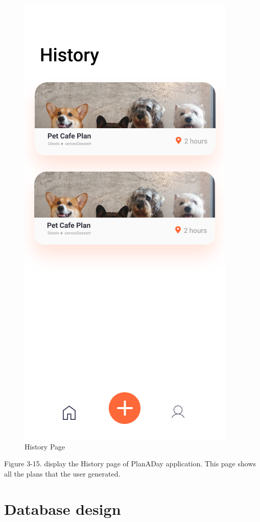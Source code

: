 \newpage
\begin{figure}[!h]
    \centering
    \includegraphics[width=0.5\linewidth]{chapter3/UI_History.png}
    \caption{History Page}
    \label{fig:History Page}
\end{figure}
\noindent
Figure 3-15. display the History page of PlanADay application. This page shows all
the plans that the user generated.
\newpage
\section{Database design}
